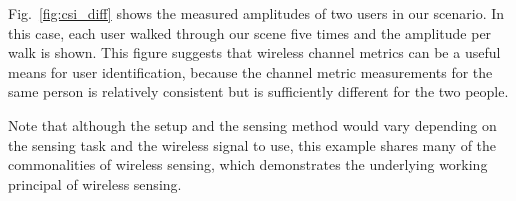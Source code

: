 Fig.~\ref{fig:csi_diff} shows the measured \CSI amplitudes of two users in our scenario. In this case, each user walked through our scene
five times and the \CSI amplitude per walk is shown. This figure suggests that wireless channel metrics can be a useful means for user
identification, because the channel metric measurements for the same person is relatively consistent but is sufficiently different for the
two  people.

Note that although the setup and the sensing method would vary depending on the sensing task and the wireless signal to use, this example
shares many of the commonalities of wireless sensing, which demonstrates the underlying working principal of wireless sensing.
